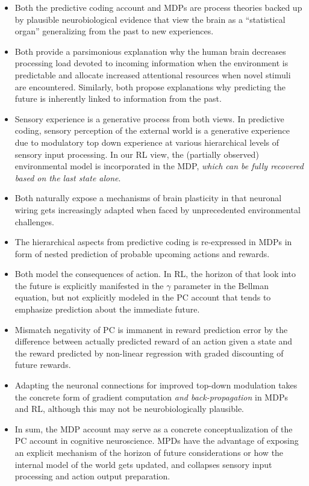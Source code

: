 \documentclass[10pt,letterpaper]{article}
\begin{document}
\begin{itemize}
  \item Both the predictive coding account and MDPs
  are process theories backed up by plausible
  neurobiological evidence that
  view the brain as a ``statistical organ''
  generalizing from the past to new experiences.
  \item Both provide a parsimonious explanation why the
  human brain decreases processing load devoted to incoming information
  when the environment is predictable and allocate increased
  attentional resources when novel stimuli are encountered.
  Similarly, both propose explanations why
  predicting the future is inherently
  linked to information from the past.
  \item Sensory experience is a generative process from both views.
  In predictive coding, sensory perception of the external world
  is a generative experience due to modulatory top down experience at
  various hierarchical levels of sensory input processing.
  In our RL view, the (partially observed)
  environmental model is incorporated in the MDP,
  \textit{which can be fully recovered based on the last
  state alone}.
  \item Both naturally expose a mechanisms of brain plasticity in that
  neuronal wiring gets increasingly adapted
  when faced by unprecedented environmental
  challenges.
  \item The hierarchical aspects from predictive coding
  is re-expressed in MDPs in form of
  nested prediction of probable upcoming actions and rewards.
  \item Both model the consequences of action. In RL, the horizon of that
  look into the future is explicitly manifested in the $\gamma$ parameter
  in the Bellman equation, but not
  explicitly modeled in the PC account that
  tends to emphasize prediction about the
  immediate future.
  \item Mismatch negativity of PC is immanent in reward prediction error
  by the difference between actually predicted reward of an action given
  a state and the reward predicted by non-linear regression with graded
  discounting of future rewards.
  \item Adapting the neuronal connections for improved top-down modulation
  takes the concrete form of gradient computation
  \textit{and back-propagation} in MDPs and RL,
  although this may not be neurobiologically plausible.
  \item In sum,
  the MDP account may serve as a concrete conceptualization of the PC account in cognitive neuroscience. MPDs have the advantage of exposing an explicit
  mechanism of the horizon of future considerations or
  how the internal model of the world gets updated,
  and collapses sensory input processing and action output preparation.
\end{itemize}
\end{document}
